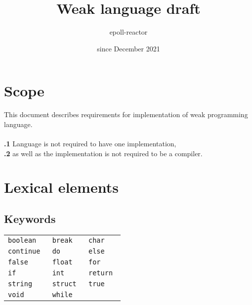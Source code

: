 \documentclass[leqno]{article}
\title{Weak language draft}
\author{epoll-reactor}
\date{since December 2021}
\begin{document}
    \pagestyle{fancy}
    \rhead{\leftmark}

    \maketitle
    \tableofcontents

    \newpage

    \section{Scope}
        This document describes requirements for implementation of weak
        programming language. \\
        \\
        \textbf{\thesubsection.1} Language is not required to have one implementation, \\
        \textbf{\thesubsection.2} as well as the implementation is not required to be
        a compiler.

    \section{Lexical elements}
        \upshape

        \subsection{Keywords}
            \begin{tabular}{ R{3cm} R{3cm} R{3cm} }
                \tt{boolean}  & \tt{break}  & \tt{char}   \\
                \tt{continue} & \tt{do}     & \tt{else}   \\
                \tt{false}    & \tt{float}  & \tt{for}    \\
                \tt{if}       & \tt{int}    & \tt{return} \\
                \tt{string}   & \tt{struct} & \tt{true}   \\
                \tt{void}     & \tt{while}
            \end{tabular}
\end{document}
